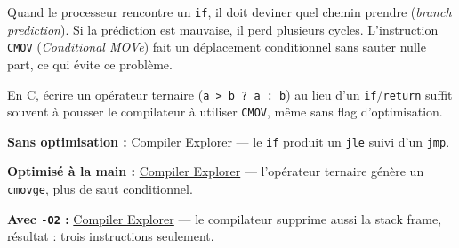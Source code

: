 \documentclass[a4paper,12pt]{article}
\begin{document}
Quand le processeur rencontre un \texttt{if}, il doit deviner quel chemin prendre (\emph{branch prediction}). Si la prédiction est mauvaise, il perd plusieurs cycles. L'instruction \texttt{CMOV} (\emph{Conditional MOVe}) fait un déplacement conditionnel sans sauter nulle part, ce qui évite ce problème.

En C, écrire un opérateur ternaire (\texttt{a > b ? a : b}) au lieu d'un \texttt{if}/\texttt{return} suffit souvent à pousser le compilateur à utiliser \texttt{CMOV}, même sans flag d'optimisation.

\textbf{Sans optimisation :} \href{https://godbolt.org/z/5PYKxofbG}{Compiler Explorer}
--- le \texttt{if} produit un \texttt{jle} suivi d'un \texttt{jmp}.

\textbf{Optimisé à la main :} \href{https://godbolt.org/z/vzxvr9hsa}{Compiler Explorer}
--- l'opérateur ternaire génère un \texttt{cmovge}, plus de saut conditionnel.

\textbf{Avec \texttt{-O2} :} \href{https://godbolt.org/z/KKnb43K35}{Compiler Explorer}
--- le compilateur supprime aussi la stack frame, résultat : trois instructions seulement.
\end{document}
